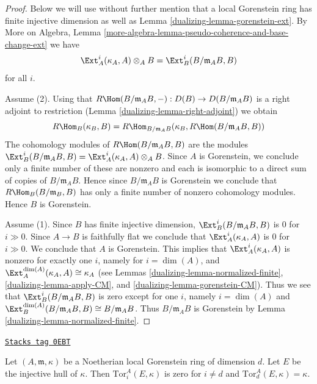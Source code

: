 \begin{proof}

Below we will use without further mention that a local Gorenstein ring
has finite injective dimension as well as Lemma \ref{dualizing-lemma-gorenstein-ext}.
By More on Algebra, Lemma
\ref{more-algebra-lemma-pseudo-coherence-and-base-change-ext}
we have
$$
\Ext^i_A(\kappa_A, A) \otimes_A B =
\Ext^i_B(B/\mathfrak m_A B, B)
$$
for all $i$.

\medskip\noindent
Assume (2). Using that
$R\Hom(B/\mathfrak m_A B, -) : D(B) \to D(B/\mathfrak m_A B)$ is a
right adjoint to restriction (Lemma \ref{dualizing-lemma-right-adjoint}) we obtain
$$
R\Hom_B(\kappa_B, B) =
R\Hom_{B/\mathfrak m_A B}(\kappa_B, R\Hom(B/\mathfrak m_A B, B))
$$
The cohomology modules of $R\Hom(B/\mathfrak m_A B, B)$ are the modules
$\Ext^i_B(B/\mathfrak m_A B, B) =
\Ext^i_A(\kappa_A, A) \otimes_A B$.
Since $A$ is Gorenstein, we conclude only a finite number of these are nonzero
and each is isomorphic to a direct sum of copies of $B/\mathfrak m_A B$.
Hence since $B/\mathfrak m_A B$ is Gorenstein we conclude that
$R\Hom_B(B/\mathfrak m_B, B)$ has only a finite number of nonzero
cohomology modules. Hence $B$ is Gorenstein.

\medskip\noindent
Assume (1). Since $B$ has finite injective dimension,
$\Ext^i_B(B/\mathfrak m_A B, B)$ is $0$ for $i \gg 0$.
Since $A \to B$ is faithfully flat
we conclude that $\Ext^i_A(\kappa_A, A)$ is $0$
for $i \gg 0$. We conclude that $A$ is Gorenstein. This implies that
$\Ext^i_A(\kappa_A, A)$ is nonzero for exactly one $i$,
namely for $i = \dim(A)$, and
$\Ext^{\dim(A)}_A(\kappa_A, A) \cong \kappa_A$
(see Lemmas \ref{dualizing-lemma-normalized-finite}, \ref{dualizing-lemma-apply-CM}, and
\ref{dualizing-lemma-gorenstein-CM}).
Thus we see that
$\Ext^i_B(B/\mathfrak m_A B, B)$ is zero except for one $i$,
namely $i = \dim(A)$ and
$\Ext^{\dim(A)}_B(B/\mathfrak m_A B, B) \cong B/\mathfrak m_A B$.
Thus $B/\mathfrak m_A B$ is Gorenstein by
Lemma \ref{dualizing-lemma-normalized-finite}.
\end{proof}

\begin{lemma}
\label{dualizing-lemma-tor-injective-hull}
\href{https://stacks.math.columbia.edu/tag/0EBT}{\texttt{Stacks tag 0EBT}}

Let $(A, \mathfrak m, \kappa)$ be a Noetherian local Gorenstein ring
of dimension $d$. Let $E$ be the injective hull of $\kappa$. Then
$\text{Tor}_i^A(E, \kappa)$ is zero for $i \not = d$
and $\text{Tor}_d^A(E, \kappa) = \kappa$.
\end{lemma}

